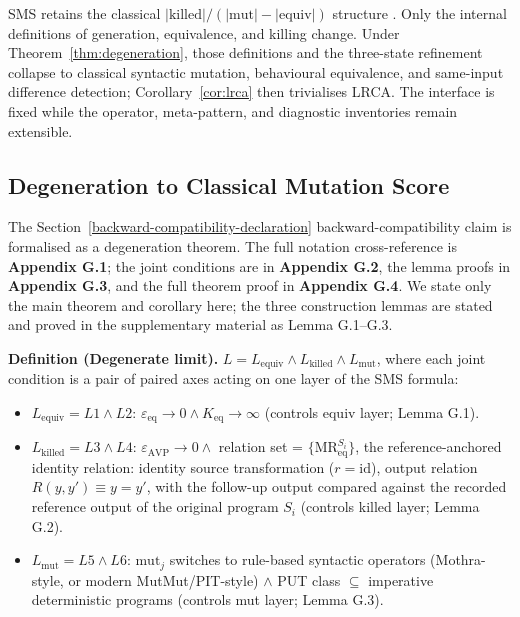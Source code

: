 \documentclass[manuscript,screen,review]{acmart}
\begin{document}
SMS retains the classical
\(\lvert\mathrm{killed}\rvert/
(\lvert\mathrm{mut}\rvert-\lvert\mathrm{equiv}\rvert)\) structure
\citep{d7c38286734419b52de4262c9802ebdfcf4b9447}. Only the internal
definitions of generation, equivalence, and killing change. Under
Theorem~\ref{thm:degeneration}, those definitions and the three-state
refinement collapse to classical syntactic mutation, behavioural
equivalence, and same-input difference detection; Corollary~\ref{cor:lrca}
then trivialises LRCA. The interface is fixed while the operator,
meta-pattern, and diagnostic inventories remain extensible.

\subsection{Degeneration to Classical Mutation Score}\label{sms-ms-degeneration-formal-statement}

The Section~\ref{backward-compatibility-declaration} backward-compatibility claim is formalised as a degeneration
theorem. The full notation cross-reference is \textbf{Appendix G.1}; the joint
conditions are in \textbf{Appendix G.2}, the lemma proofs in
\textbf{Appendix G.3}, and the full theorem proof in \textbf{Appendix G.4}. We
state only the main theorem and corollary here; the three construction
lemmas are stated and proved in the supplementary material as
Lemma G.1--G.3.

\textbf{Definition (Degenerate limit).}
$L = L_{\mathrm{equiv}} \wedge L_{\mathrm{killed}} \wedge L_{\mathrm{mut}}$, where each joint
condition is a pair of paired axes acting on one layer of the SMS
formula:

\begin{itemize}

\item
  $L_{\mathrm{equiv}} = L1 \wedge L2$: $\varepsilon_{\mathrm{eq}} \to 0 \wedge K_{\mathrm{eq}} \to \infty$ (controls equiv
  layer; Lemma G.1).
\item
  $L_{\mathrm{killed}} = L3 \wedge L4$: $\varepsilon_{\mathrm{AVP}} \to 0 \wedge$ relation set =
  $\{\mathrm{MR}_{\mathrm{eq}}^{S_i}\}$, the reference-anchored identity
  relation: identity source transformation ($r = \mathrm{id}$), output
  relation $R(y,y') \equiv y = y'$, with the follow-up output compared
  against the recorded reference output of the original program $S_i$
  (controls killed layer; Lemma G.2).
\item
  $L_{\mathrm{mut}} = L5 \wedge L6$: $\mathrm{mut}_j$ switches to rule-based syntactic
  operators (Mothra-style, or modern MutMut/PIT-style) $\wedge$ PUT class $\subseteq$ imperative deterministic
  programs (controls mut layer; Lemma G.3).
\end{itemize}
\end{document}
